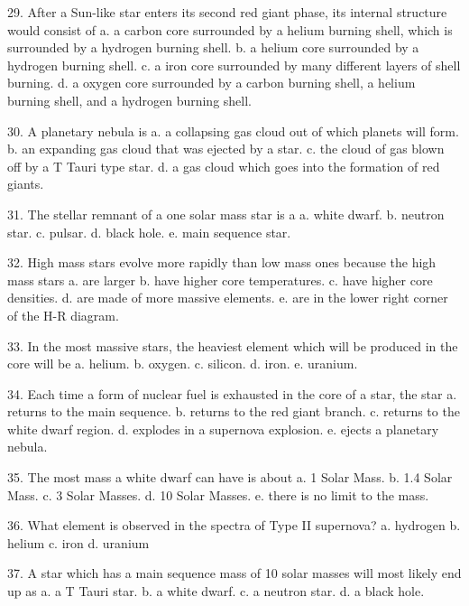   29. After a Sun-like star enters its second red giant phase, its
      internal structure would consist of
      a.  a carbon core surrounded by a helium burning shell, which is surrounded by a hydrogen burning shell.
      b.  a helium core surrounded by a hydrogen burning shell.
      c.  a iron core surrounded by many different layers of shell burning.
      d.  a oxygen core surrounded by a carbon burning shell, a helium burning shell, and a hydrogen burning shell.
      
  30. A planetary nebula is
      a.  a collapsing gas cloud out of which planets will form.
      b.  an expanding gas cloud that was ejected by a star.
      c.  the cloud of gas blown off by a T Tauri type star.
      d.  a gas cloud which goes into the formation of red giants.
      
  31. The stellar remnant of a one solar mass star is a
      a.  white dwarf.
      b.  neutron star.
      c.  pulsar.
      d.  black hole.
      e.  main sequence star.
      
  32. High mass stars evolve more rapidly than low mass ones because
      the high mass stars
      a.  are larger
      b.  have higher core temperatures.
      c.  have higher core densities.
      d.  are made of more massive elements.
      e.  are in the lower right corner of the H-R diagram.
      
  33. In the most massive stars, the heaviest element which will be
      produced in the core will be
      a.  helium.
      b.  oxygen.
      c.  silicon.
      d.  iron.
      e.  uranium.
      
 
  34. Each time a form of nuclear fuel is exhausted in the core of a
      star, the star
      a.  returns to the main sequence.
      b.  returns to the red giant branch.
      c.  returns to the white dwarf region.
      d.  explodes in a supernova explosion.
      e.  ejects a planetary nebula.
      
  35. The most mass a white dwarf can have is about
      a.  1 Solar Mass.
      b.  1.4 Solar Mass.
      c.  3 Solar Masses.
      d.  10 Solar Masses.
      e.  there is no limit to the mass.
      
  36. What element is observed in the spectra of Type II supernova?
      a.  hydrogen
      b.  helium
      c.  iron
      d.  uranium
      
  37. A star which has a main sequence mass of 10 solar masses will
      most likely end up as
      a.  a T Tauri star.
      b.  a white dwarf.
      c.  a neutron star.
      d.  a black hole.
      
